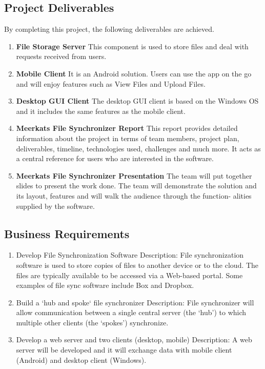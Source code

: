 \documentclass{article}
\begin{document}
\subsection{Project Deliverables}
By completing this project, the following deliverables are achieved.
\begin{enumerate}
  \item \textbf{File Storage Server} This component is used to store files and deal with requests received from users.
  \item \textbf{Mobile Client} It is an Android solution. Users can use the app on the go and will enjoy features such as View Files and Upload Files.
  \item \textbf{Desktop GUI Client} The desktop GUI client is based on the Windows OS and it includes the same features as the mobile client.
  \item \textbf{Meerkats File Synchronizer Report} This report provides detailed information about the project in terms of team members, project plan, deliverables, timeline, technologies used, challenges and much more. It acts as a central reference for users who are interested in the software.
  \item \textbf{Meerkats File Synchronizer Presentation} The team will put together slides to present the work done. The team will demonstrate the solution and its layout, features and will walk the audience through the function- alities supplied by the software.
\end{enumerate}


\subsection{Business Requirements}
\begin{enumerate}
  \item Develop File Synchronization Software
  Description:  File synchronization software is used to store copies of files to another device or to the cloud. The files are typically available to be accessed via a Web-based portal. Some examples of file sync software include Box and Dropbox.
  \item Build a ‘hub and spoke‘ file synchronizer
  Description: File synchronizer will allow communication between a single central server (the ‘hub’) to which multiple other clients (the ‘spokes’) synchronize.
  \item Develop a web server and two clients (desktop, mobile)
  Description: A web server will be developed and it will exchange data with mobile client (Android) and desktop client (Windows).
\end{enumerate}
\end{document}
